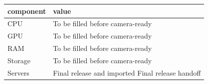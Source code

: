 \begin{tabular}{ll}
\toprule
component & value \\
\midrule
CPU & To be filled before camera-ready \\
GPU & To be filled before camera-ready \\
RAM & To be filled before camera-ready \\
Storage & To be filled before camera-ready \\
Servers & Final release and imported Final release handoff \\
\bottomrule
\end{tabular}
